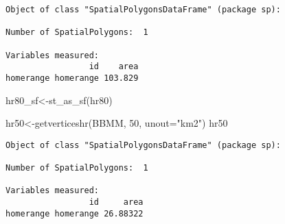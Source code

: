 \documentclass[
  letterpaper,
]{book}
\newenvironment{Shaded}{\begin{snugshade}}{\end{snugshade}}
\newcommand{\AttributeTok}[1]{\textcolor[rgb]{0.40,0.45,0.13}{#1}}
\newcommand{\DecValTok}[1]{\textcolor[rgb]{0.68,0.00,0.00}{#1}}
\newcommand{\FunctionTok}[1]{\textcolor[rgb]{0.28,0.35,0.67}{#1}}
\newcommand{\NormalTok}[1]{\textcolor[rgb]{0.00,0.23,0.31}{#1}}
\newcommand{\OtherTok}[1]{\textcolor[rgb]{0.00,0.23,0.31}{#1}}
\newcommand{\StringTok}[1]{\textcolor[rgb]{0.13,0.47,0.30}{#1}}
\begin{document}
\begin{verbatim}
Object of class "SpatialPolygonsDataFrame" (package sp):

Number of SpatialPolygons:  1

Variables measured:
                 id    area
homerange homerange 103.829
\end{verbatim}

\begin{Shaded}
\begin{Highlighting}[]
\NormalTok{hr80\_sf}\OtherTok{\textless{}{-}}\FunctionTok{st\_as\_sf}\NormalTok{(hr80)}

\NormalTok{hr50}\OtherTok{\textless{}{-}}\FunctionTok{getverticeshr}\NormalTok{(BBMM, }\DecValTok{50}\NormalTok{, }\AttributeTok{unout=}\StringTok{"km2"}\NormalTok{)}
\NormalTok{hr50}
\end{Highlighting}
\end{Shaded}

\begin{verbatim}
Object of class "SpatialPolygonsDataFrame" (package sp):

Number of SpatialPolygons:  1

Variables measured:
                 id     area
homerange homerange 26.88322
\end{verbatim}
\end{document}
